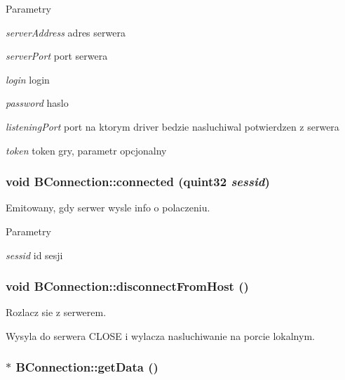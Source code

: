 \begin{DoxyParams}{Parametry}
\item[{\em serverAddress}]adres serwera \item[{\em serverPort}]port serwera \item[{\em login}]login \item[{\em password}]haslo \item[{\em listeningPort}]port na ktorym driver bedzie nasluchiwal potwierdzen z serwera \item[{\em token}]token gry, parametr opcjonalny \end{DoxyParams}
\hypertarget{class_b_connection_a90dca3f0343427e31bb4544a8accf56d}{
\subsubsection[{connected}]{\setlength{\rightskip}{0pt plus 5cm}void BConnection::connected (quint32 {\em sessid})}}
\label{class_b_connection_a90dca3f0343427e31bb4544a8accf56d}


Emitowany, gdy serwer wysle info o polaczeniu. 


\begin{DoxyParams}{Parametry}
\item[{\em sessid}]id sesji \end{DoxyParams}
\hypertarget{class_b_connection_a9035d3ca3836f1c841e0f91327753f14}{
\subsubsection[{disconnectFromHost}]{\setlength{\rightskip}{0pt plus 5cm}void BConnection::disconnectFromHost ()}}
\label{class_b_connection_a9035d3ca3836f1c841e0f91327753f14}


Rozlacz sie z serwerem. 

Wysyla do serwera CLOSE i wylacza nasluchiwanie na porcie lokalnym. \hypertarget{class_b_connection_a68fb4ff5ee98e5228378d08a2fe2ae19}{
\subsubsection[{getData}]{ $\ast$ BConnection::getData ()}}
\label{class_b_connection_a68fb4ff5ee98e5228378d08a2fe2ae19}



